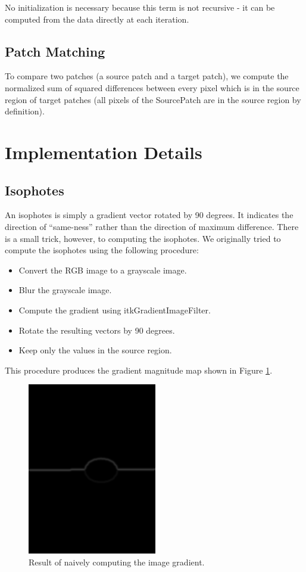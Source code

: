 \documentclass{InsightArticle}
\begin{document}
No initialization is necessary because this term is not recursive - it can be computed from the data directly at each iteration.

\subsection{Patch Matching}
\label{subsec:AlgorithmDetails:PatchMatching}
To compare two patches (a source patch and a target patch), we compute the normalized sum of squared differences between every pixel which is in the source region of target patches (all pixels of the SourcePatch are in the source region by definition).

\section{Implementation Details}
\label{sec:ImplementationDetails}

\subsection{Isophotes}
An isophotes is simply a gradient vector rotated by 90 degrees. It indicates the direction of ``same-ness'' rather than the direction of maximum difference. There is a small trick, however, to computing the isophotes. We originally tried to compute the isophotes using the following procedure:

\begin{itemize}
 \item Convert the RGB image to a grayscale image.
 \item Blur the grayscale image.
 \item Compute the gradient using itkGradientImageFilter.
 \item Rotate the resulting vectors by 90 degrees.
 \item Keep only the values in the source region.
\end{itemize}

This procedure produces the gradient magnitude map shown in Figure \ref{fig:ErroneousGradient}.
\begin{figure}[H]
  \centering
  \includegraphics[width=0.3\linewidth]{images/ErroneousGradient}
  \caption{Result of naively computing the image gradient.}
  \label{fig:ErroneousGradient}
\end{figure}
\end{document}
